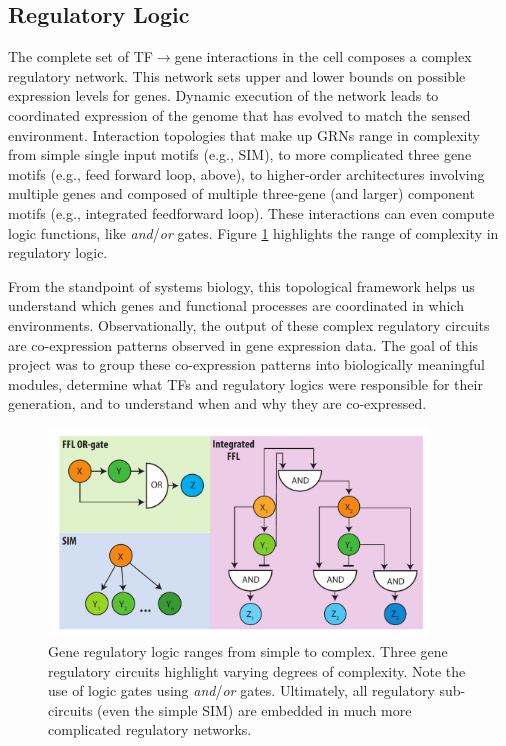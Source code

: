 \subsection{Regulatory Logic}

The complete set of TF$\rightarrow$gene interactions in the cell composes a complex regulatory network. This network sets upper and lower bounds on possible expression levels for genes. Dynamic execution of the network leads to coordinated expression of the genome that has evolved to match the sensed environment. Interaction topologies that make up GRNs range in complexity from simple single input motifs (e.g., SIM), to more complicated three gene motifs (e.g., feed forward loop, above), to higher-order architectures involving multiple genes and composed of multiple three-gene (and larger) component motifs (e.g., integrated feedforward loop). These interactions can even compute logic functions, like \textit{and}/\textit{or} gates. Figure \ref{fig:chap1:regLogic} highlights the range of complexity in regulatory logic.

From the standpoint of systems biology, this topological framework helps us understand which genes and functional processes are coordinated in which environments. Observationally, the output of these complex regulatory circuits are co-expression patterns observed in gene expression data. The goal of this project was to group these co-expression patterns into biologically meaningful modules, determine what TFs and regulatory logics were responsible for their generation, and to understand when and why they are co-expressed.  

\begin{figure}[h!]
    \centering
    \includegraphics[width=0.9\textwidth]{figures/regLogic}
 	\caption[Varieties of regulatory logic, from simple to complex]{Gene regulatory logic ranges from simple to complex. Three gene regulatory circuits highlight varying degrees of complexity. Note the use of logic gates using \textit{and}/\textit{or} gates. Ultimately, all regulatory sub-circuits (even the simple SIM) are embedded in much more complicated regulatory networks.  
}
    \label{fig:chap1:regLogic}
\end{figure}

